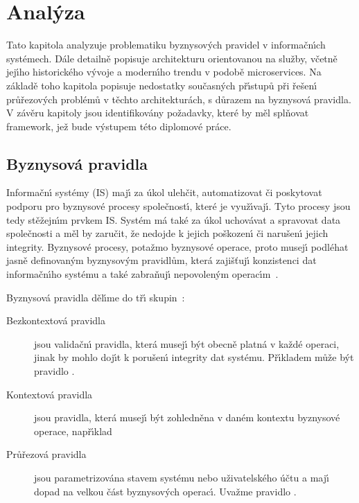
\chapter{Anal\'yza}\label{ch:analyza}

Tato kapitola analyzuje problematiku byznysov\'ych pravidel v informačn\'{\i}ch systémech.
Dále detailně popisuje architekturu orientovanou na služby, včetně jej\'{\i}ho historického
v\'yvoje a modern\'{\i}ho trendu v podobě microservices. Na základě toho kapitola popisuje nedostatky
současn\'ych př\'{\i}stupů při řešen\'{\i} průřezov\'ych problémů v těchto architekturách, s důrazem na byznysová pravidla.
V závěru kapitoly jsou identifikovány požadavky, které by měl splňovat framework,
jež bude v\'ystupem této diplomové práce.

\section{Byznysová pravidla}\label{sec:business-rules}

Informačn\'{\i} systémy (\gls{IS}) maj\'{\i} za úkol ulehčit, automatizovat či poskytovat podporu pro
byznysové procesy společnost\'{\i}, které je využ\'{\i}vaj\'{\i}. Tyto procesy jsou tedy stěžejn\'{\i}m
prvkem \gls{IS}. Systém má také za úkol uchovávat a spravovat data společnosti
a měl by zaručit, že nedojde k jejich poškozen\'{\i} či narušen\'{\i} jejich integrity.
Byznysové procesy, potažmo byznysové operace, proto musej\'{\i}
podléhat jasně definovan\'ym byznysov\'ym pravidlům, která zajišťuj\'{\i} konzistenci dat informačn\'{\i}ho
systému a také zabraňuj\'{\i} nepovolen\'ym operac\'{\i}m~\cite{cemus2015automated}.

Byznysová pravidla děl\'{\i}me do tř\'{\i} skupin~\cite{cemus2014aspect}:
\begin{description}
    \item [Bezkontextová pravidla] jsou validačn\'{\i} pravidla, která musej\'{\i} b\'yt obecně platná
    v každé operaci, jinak by mohlo doj\'{\i}t k porušen\'{\i} integrity dat systému. Př\'{\i}kladem může
    b\'yt pravidlo .
    \item [Kontextová pravidla] jsou pravidla, která musej\'{\i} b\'yt zohledněna v daném kontextu
    byznysové operace, např\'{\i}klad 
    \item [Průřezová pravidla] jsou parametrizována stavem systému nebo uživatelského účtu a maj\'{\i}
    dopad na velkou část byznysov\'ych operac\'{\i}. Uvažme pravidlo .
\end{description}

